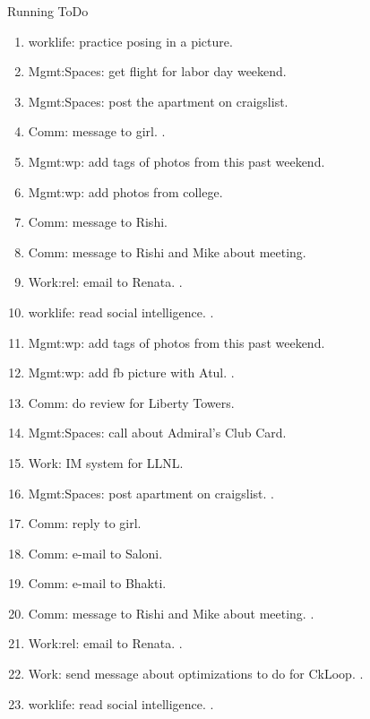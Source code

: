 \begin{columns}
\begin{column}{0.6\linewidth}
\begin{block}{Running ToDo}
\begin{enumerate}
        \item \tiny worklife: practice posing in a picture.  
        \item \tiny Mgmt:Spaces: get flight for labor day weekend. 
        \item \tiny Mgmt:Spaces: post the apartment on craigslist. 

        \item \tiny Comm: message to girl.  . 

        \item \tiny Mgmt:wp: add tags of photos from this past weekend. 
        \item \tiny Mgmt:wp: add photos from college. 
        \item \tiny Comm: message to Rishi.
        \item \tiny Comm: message to Rishi and Mike about meeting.
        \item \tiny Work:rel: email to Renata. . 

         
        \item \tiny worklife: read social intelligence. . 

        \item \tiny Mgmt:wp: add tags of photos from this past weekend.  
        \item \tiny Mgmt:wp: add fb picture with Atul. \dl{}. 
        \item \tiny Comm: do review for Liberty Towers.
        \item \tiny Mgmt:Spaces: call about Admiral's Club Card.
        \item \tiny Work: IM system for LLNL.
        \item \tiny Mgmt:Spaces: post apartment on craigslist. .

        \item \tiny Comm: reply to girl. 
        \item \tiny Comm: e-mail to Saloni.
        \item \tiny Comm: e-mail to Bhakti. 
        \item \tiny Comm: message to Rishi and Mike about
          meeting. . 
        \item \tiny Work:rel: email to Renata. . 
        \item \tiny Work: send message about optimizations to do for
          CkLoop.  . 
        \item \tiny worklife: read social intelligence. . 


\end{enumerate}
\end{block}
\end{column}
\end{columns}

